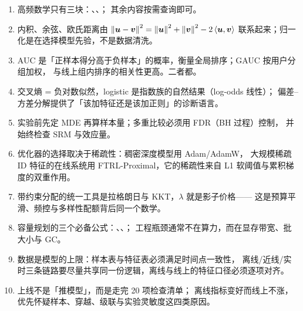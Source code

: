 \begin{keypoint}[本章要点回顾]
\begin{enumerate}
  \item 高频数学只有三块：、、；
        其余内容按需查询即可。
  \item 内积、余弦、欧氏距离由 $\left\lVert \bm{u}-\bm{v} \right\rVert^2 = \left\lVert \bm{u} \right\rVert^2+\left\lVert \bm{v} \right\rVert^2-2\left\langle \bm{u}, \bm{v} \right\rangle$
        联系起来；归一化是在选择模型先验，不是数据清洗。
  \item AUC 是「正样本得分高于负样本」的概率，衡量全局排序；GAUC 按用户分组加权，
        与线上组内排序的相关性更高。二者都。
  \item 交叉熵 = 负对数似然，logistic 是指数族的自然结果（log-odds 线性）；
        偏差--方差分解提供了「该加特征还是该加正则」的诊断语言。
  \item 实验前先定 MDE 再算样本量；多重比较必须用 FDR（BH 过程）控制，
        并始终检查 SRM 与效应量。
  \item 优化器的选择取决于稀疏性：稠密深度模型用 Adam/AdamW，
        大规模稀疏 ID 特征的在线系统用 FTRL-Proximal，它的稀疏性来自 L1 软阈值与累积梯度的双重作用。
  \item 带约束分配的统一工具是拉格朗日与 KKT，$\lambda$ 就是影子价格——
        这是预算平滑、频控与多样性配额背后同一个数学。
  \item 容量规划的三个必备公式：、、；
        工程瓶颈通常不在算力，而在显存带宽、批大小与 GC。
  \item 数据是模型的上限：样本表与特征表必须满足时间点一致性，
        离线/近线/实时三条链路要尽量共享同一份逻辑，离线与线上的特征口径必须逐项对齐。
  \item 上线不是「推模型」，而是走完 20 项检查清单；
        离线指标变好而线上不涨，优先怀疑样本、穿越、级联与实验灵敏度这四类原因。
\end{enumerate}
\end{keypoint}

